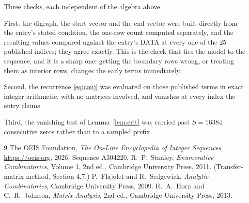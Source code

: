 \documentclass[11pt,a4paper]{article}
\theoremstyle{plain}
\theoremstyle{definition}
\begin{document}
Three checks, each independent of the algebra above.

First, the digraph, the start vector and the end vector were built directly from the
entry's stated condition, the one-row count computed separately, and the resulting values
compared against the entry's DATA at every one of the $25$ published indices; they
agree exactly. This is the check that ties the model to the sequence, and it is a sharp one:
getting the boundary rows wrong, or treating them as interior rows, changes the early terms
immediately.

Second, the recurrence \eqref{eq:conj} was evaluated on those published terms in exact
integer arithmetic, with no matrices involved, and vanishes at every index the entry claims.

Third, the vanishing test of Lemma~\ref{lem:crit} was carried past $S=16384$ consecutive
zeros rather than to a sampled prefix.

\begin{thebibliography}{9}
 The OEIS Foundation, \emph{The On-Line Encyclopedia of Integer
Sequences}, \url{https://oeis.org}, 2026. Sequence A304220.
 R.~P.~Stanley, \emph{Enumerative Combinatorics}, Volume 1, 2nd ed.,
Cambridge University Press, 2011. (Transfer-matrix method, Section 4.7.)
 P.~Flajolet and R.~Sedgewick, \emph{Analytic Combinatorics}, Cambridge
University Press, 2009.
 R.~A.~Horn and C.~R.~Johnson, \emph{Matrix Analysis}, 2nd ed., Cambridge
University Press, 2013.
\end{thebibliography}
\end{document}
